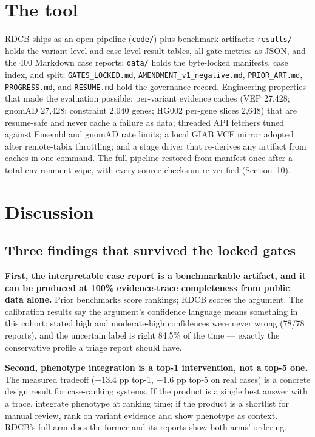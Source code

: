 \documentclass[11pt]{article}
\begin{document}
\section{The tool}
\label{sec:tool}
RDCB ships as an open pipeline (\texttt{code/}) plus benchmark artifacts:
\texttt{results/} holds the variant-level and case-level result tables, all gate
metrics as JSON, and the 400 Markdown case reports; \texttt{data/} holds the
byte-locked manifests, case index, and split; \texttt{GATES\_LOCKED.md},
\texttt{AMENDMENT\_v1\_negative.md}, \texttt{PRIOR\_ART.md}, \texttt{PROGRESS.md},
and \texttt{RESUME.md} hold the governance record. Engineering properties that made
the evaluation possible: per-variant evidence caches (VEP 27,428; gnomAD 27,428;
constraint 2,040 genes; HG002 per-gene slices 2,648) that are resume-safe and never
cache a failure as data; threaded API fetchers tuned against Ensembl and gnomAD
rate limits; a local GIAB VCF mirror adopted after remote-tabix throttling; and a
stage driver that re-derives any artifact from caches in one command. The full
pipeline restored from manifest once after a total environment wipe, with every
source checksum re-verified (Section~10).

\section{Discussion}
\subsection{Three findings that survived the locked gates}
\textbf{First, the interpretable case report is a benchmarkable artifact, and it can
be produced at 100\% evidence-trace completeness from public data alone.} Prior
benchmarks score rankings; RDCB scores the argument. The calibration results say the
argument's confidence language means something in this cohort: stated high and
moderate-high confidences were never wrong (78/78 reports), and the uncertain label
is right 84.5\% of the time --- exactly the conservative profile a triage report
should have.

\textbf{Second, phenotype integration is a top-1 intervention, not a top-5 one.}
The measured tradeoff ($+13.4$ pp top-1, $-1.6$ pp top-5 on real cases) is a
concrete design result for case-ranking systems. If the product is a single best
answer with a trace, integrate phenotype at ranking time; if the product is a
shortlist for manual review, rank on variant evidence and show phenotype as context.
RDCB's full arm does the former and its reports show both arms' ordering.
\end{document}

